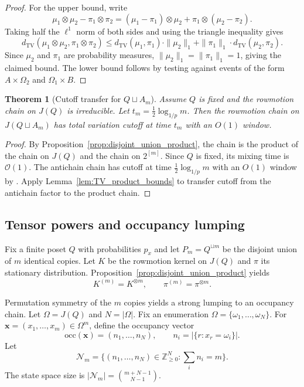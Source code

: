 \documentclass[final,3p,times]{elsarticle}
\newtheorem{theorem}{Theorem}[section]
\theoremstyle{definition}
\newcommand{\TV}{d_{\mathrm{TV}}}
\newcommand{\cO}{\mathcal{O}}
\begin{document}
\begin{proof}
For the upper bound, write
\[
\mu_1\otimes\mu_2-\pi_1\otimes\pi_2 = (\mu_1-\pi_1)\otimes \mu_2 + \pi_1\otimes(\mu_2-\pi_2).
\]
Taking half the $\ell^1$ norm of both sides and using the triangle inequality gives
\[
\TV(\mu_1\otimes\mu_2,\pi_1\otimes\pi_2)\le \TV(\mu_1,\pi_1)\cdot\|\mu_2\|_1 + \|\pi_1\|_1\cdot\TV(\mu_2,\pi_2).
\]
Since $\mu_2$ and $\pi_1$ are probability measures, $\|\mu_2\|_1 = \|\pi_1\|_1 = 1$, giving the claimed bound.
The lower bound follows by testing against events of the form $A\times \Omega_2$ and $\Omega_1\times B$.
\end{proof}

\begin{theorem}[Cutoff transfer for $Q\sqcup A_m$]\label{thm:Q_plus_antichain_cutoff}
Assume $Q$ is fixed and the rowmotion chain on $J(Q)$ is irreducible.
Let $t_m=\frac12\log_{1/p}m$.
Then the rowmotion chain on $J(Q\sqcup A_m)$ has total variation cutoff at time $t_m$ with an $O(1)$ window.
\end{theorem}

\begin{proof}
By Proposition~\ref{prop:disjoint_union_product}, the chain is the product of the chain on $J(Q)$ and the chain on $2^{[m]}$.
Since $Q$ is fixed, its mixing time is $\cO(1)$.
The antichain chain has cutoff at time $\frac12\log_{1/p}m$ with an $O(1)$ window by \cite[Theorem 1.6]{DefantLiNestoridi2024Rowmotion}.
Apply Lemma~\ref{lem:TV_product_bounds} to transfer cutoff from the antichain factor to the product chain.
\end{proof}

\subsection{Tensor powers and occupancy lumping}

Fix a finite poset $Q$ with probabilities $p_x$ and let $P_m=Q^{\sqcup m}$ be the disjoint union of $m$ identical copies.
Let $K$ be the rowmotion kernel on $J(Q)$ and $\pi$ its stationary distribution.
Proposition~\ref{prop:disjoint_union_product} yields
\begin{equation}\label{eq:tensor_power}
K^{(m)} = K^{\otimes m},
\qquad
\pi^{(m)} = \pi^{\otimes m}.
\end{equation}

Permutation symmetry of the $m$ copies yields a strong lumping to an occupancy chain.
Let $\Omega=J(Q)$ and $N=|\Omega|$.
Fix an enumeration $\Omega=\{\omega_1,\dots,\omega_N\}$.
For $\mathbf{x}=(x_1,\dots,x_m)\in\Omega^m$, define the occupancy vector
\[
\mathrm{occ}(\mathbf{x}) = (n_1,\dots,n_N),
\qquad
n_i = |\{r: x_r=\omega_i\}|.
\]
Let
\[
\mathcal{N}_m = \{(n_1,\dots,n_N)\in \mathbb{Z}_{\ge 0}^N: \sum_i n_i = m\}.
\]
The state space size is $|\mathcal{N}_m|=\binom{m+N-1}{N-1}$.
\end{document}
